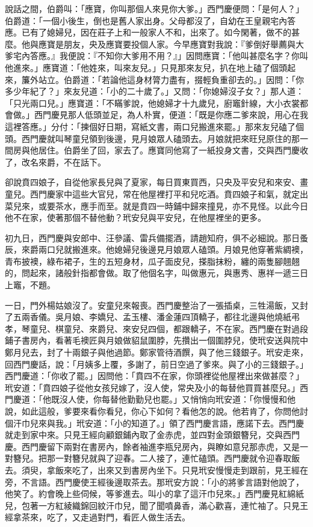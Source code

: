 說話之間，伯爵叫：「應寶，你叫那個人來見你大爹。」西門慶便問：「是何人？」伯爵道：「一個小後生，倒也是舊人家出身。父母都沒了，自幼在王皇親宅內答應。已有了媳婦兒，因在莊子上和一般家人不和，出來了。如今閑著，做不的甚麼。他與應寶是朋友，央及應寶要投個人家。今早應寶對我說：『爹倒好舉薦與大爹宅內答應。』我便說：『不知你大爹用不用？』」因問應寶：「他叫甚麼名字？你叫他進來。」應寶道：「他姓來，叫來友兒。」只見那來友兒，扒在地上磕了個頭起來，簾外站立。伯爵道：「若論他這身材膂力盡有，掇輕負重卻去的。」因問：「你多少年紀了？」來友兒道：「小的二十歲了。」又問：「你媳婦沒子女？」那人道：「只光兩口兒。」應寶道：「不瞞爹說，他媳婦才十九歲兒，廚竈針線，大小衣裳都會做。」西門慶見那人低頭並足，為人朴實，便道：「既是你應二爹來說，用心在我這裡答應。」分付：「揀個好日期，寫紙文書，兩口兒搬進來罷。」那來友兒磕了個頭。西門慶就叫琴童兒領到後邊，見月娘眾人磕頭去。月娘就把來旺兒原住的那一間房與他居住。伯爵坐了回，家去了。應寶同他寫了一紙投身文書，交與西門慶收了，改名來爵，不在話下。

卻說賁四娘子，自從他家長兒與了夏家，每日買東買西，只央及平安兒和來安、畫童兒。西門慶家中這些大官兒，常在他屋裡打平和兒吃酒。賁四娘子和氣，就定出菜兒來，或要茶水，應手而至。就是賁四一時鋪中歸來撞見，亦不見怪。以此今日他不在家，使著那個不替他動？玳安兒與平安兒，在他屋裡坐的更多。

初九日，西門慶與安郎中、汪參議、雷兵備擺酒，請趙知府，俱不必細說。那日蚤辰，來爵兩口兒就搬進來。他媳婦兒後邊見月娘眾人磕頭。月娘見他穿著紫綢襖，青布披襖，綠布裙子，生的五短身材，瓜子面皮兒，搽脂抹粉，纏的兩隻腳翹翹的，問起來，諸般針指都會做。取了他個名字，叫做惠元，與惠秀、惠祥一遞三日上竈，不題。

一日，門外楊姑娘沒了。安童兒來報喪。西門慶整治了一張插桌，三牲湯飯，又封了五兩香儀。吳月娘、李嬌兒、孟玉樓、潘金蓮四頂轎子，都往北邊與他燒紙弔孝，琴童兒、棋童兒、來爵兒、來安兒四個，都跟轎子，不在家。西門慶在對過段鋪子書房內，看著毛襖匠與月娘做貂鼠圍脖，先攢出一個圍脖兒，使玳安送與院中鄭月兒去，封了十兩銀子與他過節。鄭家管待酒饌，與了他三錢銀子。玳安走來，回西門慶話，說：「月姨多上覆，多謝了，前日空過了爹來。與了小的三錢銀子。」西門慶道：「你收了罷。」因問他：「賁四不在家，你頭裡從他屋裡出來做甚麼？」玳安道：「賁四娘子從他女孩兒嫁了，沒人使，常央及小的每替他買買甚麼兒。」西門慶道：「他既沒人使，你每替他勤勤兒也罷。」又悄悄向玳安道：「你慢慢和他說，如此這般，爹要來看你看兒，你心下如何？看他怎的說。他若肯了，你問他討個汗巾兒來與我。」玳安道：「小的知道了。」領了西門慶言語，應諾下去。西門慶就走到家中來。只見王經向顧銀鋪內取了金赤虎，並四對金頭銀簪兒，交與西門慶。西門慶留下兩對在書房內，餘者袖進李瓶兒房內，與瞭如意兒那赤虎，又是一對簪兒。把那一對簪兒就與了迎春。二人接了，連忙磕頭。西門慶就令迎春取飯去。須臾，拿飯來吃了，出來又到書房內坐下。只見玳安慢慢走到跟前，見王經在旁，不言語。西門慶使王經後邊取茶去。那玳安方說：「小的將爹言語對他說了，他笑了。約會晚上些伺候，等爹進去。叫小的拿了這汗巾兒來。」西門慶見紅綿紙兒，包著一方紅綾織錦回紋汗巾兒，聞了聞噴鼻香，滿心歡喜，連忙袖了。只見王經拿茶來，吃了，又走過對門，看匠人做生活去。

